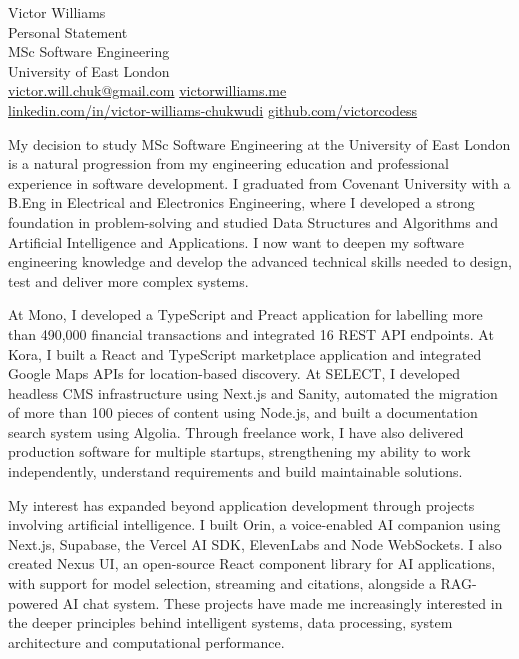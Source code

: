 \documentclass[11pt,a4paper]{article}
\begin{document}
\begin{center}
{\Large Victor Williams}\\[0.4em]
Personal Statement\\[0.15em]
MSc Software Engineering\\
University of East London\\[0.4em]
{\small
\href{mailto:victor.will.chuk@gmail.com}{victor.will.chuk@gmail.com}
\quad
\href{https://www.victorwilliams.me/}{victorwilliams.me}\\[0.15em]
\href{https://www.linkedin.com/in/victor-williams-chukwudi/}{linkedin.com/in/victor-williams-chukwudi}
\quad
\href{https://github.com/victorcodess}{github.com/victorcodess}
}
\end{center}

\vspace{0.2em}

My decision to study MSc Software Engineering at the University of East London is a natural progression from my engineering education and professional experience in software development. I graduated from Covenant University with a B.Eng in Electrical and Electronics Engineering, where I developed a strong foundation in problem-solving and studied Data Structures and Algorithms and Artificial Intelligence and Applications. I now want to deepen my software engineering knowledge and develop the advanced technical skills needed to design, test and deliver more complex systems.

At Mono, I developed a TypeScript and Preact application for labelling more than 490,000 financial transactions and integrated 16 REST API endpoints. At Kora, I built a React and TypeScript marketplace application and integrated Google Maps APIs for location-based discovery. At SELECT, I developed headless CMS infrastructure using Next.js and Sanity, automated the migration of more than 100 pieces of content using Node.js, and built a documentation search system using Algolia. Through freelance work, I have also delivered production software for multiple startups, strengthening my ability to work independently, understand requirements and build maintainable solutions.

My interest has expanded beyond application development through projects involving artificial intelligence. I built Orin, a voice-enabled AI companion using Next.js, Supabase, the Vercel AI SDK, ElevenLabs and Node WebSockets. I also created Nexus UI, an open-source React component library for AI applications, with support for model selection, streaming and citations, alongside a RAG-powered AI chat system. These projects have made me increasingly interested in the deeper principles behind intelligent systems, data processing, system architecture and computational performance.
\end{document}
